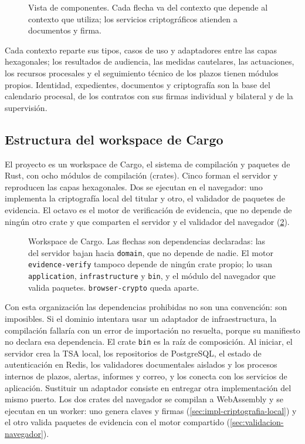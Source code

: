 \begin{figure}[H]
  \centering
  
  \caption{Vista de componentes. Cada flecha va del contexto que depende al contexto que utiliza; los servicios criptográficos atienden a documentos y firma.}
  \label{fig:componentes}
\end{figure}

Cada contexto reparte sus tipos, casos de uso y adaptadores entre las capas hexagonales; los resultados de audiencia, las medidas cautelares, las actuaciones, los recursos procesales y el seguimiento técnico de los plazos tienen módulos propios. Identidad, expedientes, documentos y criptografía son la base del calendario procesal, de los contratos con sus firmas individual y bilateral y de la supervisión.

\subsection{Estructura del workspace de Cargo}\label{sec:workspace-cargo}

El proyecto es un workspace de Cargo, el sistema de compilación y paquetes de Rust, con ocho módulos de compilación (crates). Cinco forman el servidor y reproducen las capas hexagonales. Dos se ejecutan en el navegador: uno implementa la criptografía local del titular y otro, el validador de paquetes de evidencia. El octavo es el motor de verificación de evidencia, que no depende de ningún otro crate y que comparten el servidor y el validador del navegador (\cref{fig:workspace}).

\begin{figure}[tbp]
  \centering
  
  \caption{Workspace de Cargo. Las flechas son dependencias declaradas: las del servidor bajan hacia \texttt{domain}, que no depende de nadie. El motor \texttt{evidence-verify} tampoco depende de ningún crate propio; lo usan \texttt{application}, \texttt{infrastructure} y \texttt{bin}, y el módulo del navegador que valida paquetes. \texttt{browser-crypto} queda aparte.}
  \label{fig:workspace}
\end{figure}

Con esta organización las dependencias prohibidas no son una convención: son imposibles. Si el dominio intentara usar un adaptador de infraestructura, la compilación fallaría con un error de importación no resuelta, porque su manifiesto no declara esa dependencia. El crate \texttt{bin} es la raíz de composición. Al iniciar, el servidor crea la TSA local, los repositorios de PostgreSQL, el estado de autenticación en Redis, los validadores documentales aislados y los procesos internos de plazos, alertas, informes y correo, y los conecta con los servicios de aplicación. Sustituir un adaptador consiste en entregar otra implementación del mismo puerto. Los dos crates del navegador se compilan a WebAssembly y se ejecutan en un worker: uno genera claves y firmas (\cref{sec:impl-criptografia-local}) y el otro valida paquetes de evidencia con el motor compartido (\cref{sec:validacion-navegador}).

